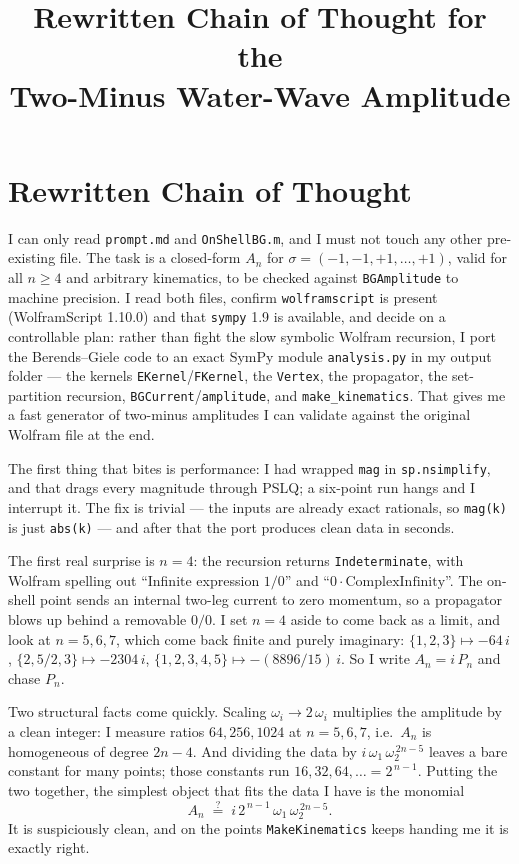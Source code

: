 \documentclass{article}
\title{Rewritten Chain of Thought for the\\
Two-Minus Water-Wave Amplitude}
\author{}
\date{}
\begin{document}
\maketitle


\section*{Rewritten Chain of Thought}

I can only read \texttt{prompt.md} and \texttt{OnShellBG.m}, and I must not touch
any other pre-existing file. The task is a closed-form $A_n$ for
$\sigma=(-1,-1,+1,\dots,+1)$, valid for all $n\ge4$ and arbitrary kinematics, to
be checked against \texttt{BGAmplitude} to machine precision. I read both files,
confirm \texttt{wolframscript} is present (WolframScript 1.10.0) and that
\texttt{sympy} 1.9 is available, and decide on a controllable plan: rather than
fight the slow symbolic Wolfram recursion, I port the Berends--Giele code to an
exact SymPy module \texttt{analysis.py} in my output folder --- the kernels
\texttt{EKernel}/\texttt{FKernel}, the \texttt{Vertex}, the propagator, the
set-partition recursion, \texttt{BGCurrent}/\texttt{amplitude}, and
\texttt{make\_kinematics}. That gives me a fast generator of two-minus amplitudes
I can validate against the original Wolfram file at the end.

The first thing that bites is performance: I had wrapped \texttt{mag} in
\texttt{sp.nsimplify}, and that drags every magnitude through PSLQ; a six-point
run hangs and I interrupt it. The fix is trivial --- the inputs are already exact
rationals, so \texttt{mag(k)} is just \texttt{abs(k)} --- and after that the port
produces clean data in seconds.

The first real surprise is $n=4$: the recursion returns \texttt{Indeterminate},
with Wolfram spelling out ``Infinite expression $1/0$'' and ``$0\cdot
\text{ComplexInfinity}$''. The on-shell point sends an internal two-leg current
to zero momentum, so a propagator blows up behind a removable $0/0$. I set $n=4$
aside to come back as a limit, and look at $n=5,6,7$, which come back finite and
purely imaginary: $\{1,2,3\}\mapsto-64\,i$, $\{2,5/2,3\}\mapsto-2304\,i$,
$\{1,2,3,4,5\}\mapsto-(8896/15)\,i$. So I write $A_n=i\,P_n$ and chase $P_n$.

Two structural facts come quickly. Scaling $\omega_i\to2\,\omega_i$ multiplies the
amplitude by a clean integer: I measure ratios $64,256,1024$ at $n=5,6,7$, i.e.\
$A_n$ is homogeneous of degree $2n-4$. And dividing the data by
$i\,\omega_1\,\omega_2^{\,2n-5}$ leaves a bare constant for many points; those
constants run $16,32,64,\dots=2^{\,n-1}$. Putting the two together, the simplest
object that fits the data I have is the monomial
\[
A_n \;\stackrel{?}{=}\; i\,2^{\,n-1}\,\omega_1\,\omega_2^{\,2n-5}.
\]
It is suspiciously clean, and on the points \texttt{MakeKinematics} keeps handing
me it is exactly right.
\end{document}
